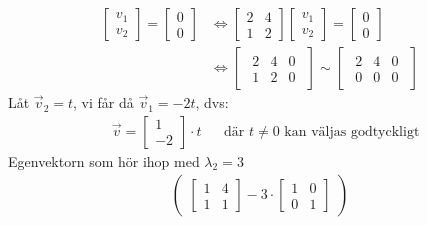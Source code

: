 \begin{Ex}
\begin{align*}
		\begin{bmatrix}
		v_1\\
		v_2 
		\end{bmatrix} = 
		\begin{bmatrix}
			0\\
			0 
		\end{bmatrix}
		&\Leftrightarrow
		\begin{bmatrix}
		2 & 4\\
		1 & 2 
		\end{bmatrix}
		\begin{bmatrix} 
			v_1\\
			v_2 
		\end{bmatrix} = 
		\begin{bmatrix} 
			0\\
			0 
		\end{bmatrix}\\
		&\Leftrightarrow 
		\begin{bmatrix}
			\begin{array}{cc|c}
			    2 & 4 & 0\\
			    1 & 2 & 0
			\end{array}
		\end{bmatrix}
		\sim
		\begin{bmatrix}
			\begin{array}{cc|c}
			    2 & 4 & 0\\
			    0 & 0 & 0
			\end{array}
		\end{bmatrix}
	\end{align*}
	Låt $\vec{v}_2 = t$, vi får då $\vec{v}_1 = -2t$, dvs:
	\begin{align*}
	&\vec{v} = 
	\begin{bmatrix}
	    1\\
	    -2
	\end{bmatrix} \cdot t
	&&\mbox{där $t \neq 0$ kan väljas godtyckligt}
	\end{align*}
	Egenvektorn som hör ihop med $\lambda_2 = 3$
	\begin{gather*}
		\begin{pmatrix}
			\begin{bmatrix}
				1 & 4\\
				1 & 1	
			\end{bmatrix}
			- 3 \cdot
			\begin{bmatrix}
				1 & 0\\
				0 & 1
			\end{bmatrix}
		\end{pmatrix}

\end{gather*}
\end{Ex}
